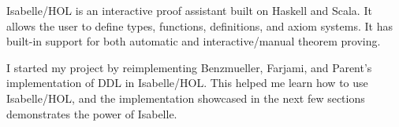 %
\begin{isabellebody}%
%
%
\isadelimtheory
%
\endisadelimtheory
%
\isatagtheory
%
\endisatagtheory
{\isafoldtheory}%
%
\isadelimtheory
%
\endisadelimtheory
%
\isadelimdocument
%
\endisadelimdocument
%
\isatagdocument
%
\isamarkuptrue%
%
\endisatagdocument
{\isafolddocument}%
%
\isadelimdocument
%
\endisadelimdocument
%
\begin{isamarkuptext}%
Isabelle/HOL is an interactive proof assistant \cite{isabelle} built on Haskell and Scala. It 
allows the user to define types, functions, definitions, and axiom systems. It has built-in support for both
automatic and interactive/manual theorem proving. 

I started my project by reimplementing Benzmueller, Farjami, and Parent's \cite{BFP, logikey} implementation 
of DDL in Isabelle/HOL. This helped me learn how to use Isabelle/HOL, and the implementation showcased in the 
next few sections demonstrates the power of Isabelle.


\end{isamarkuptext}
\end{isabellebody}
